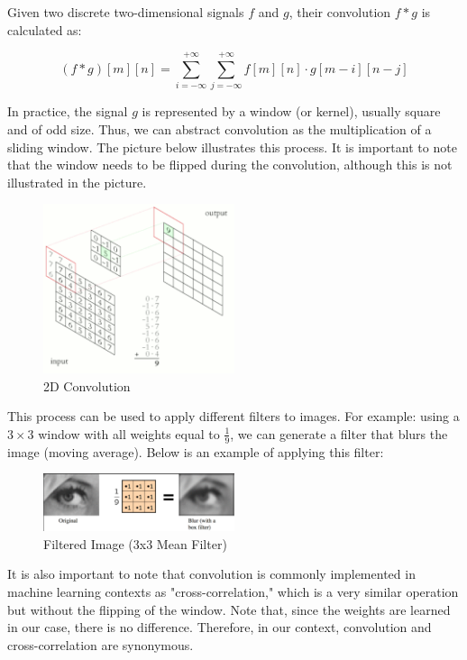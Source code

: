 Given two discrete two-dimensional signals \(f\) and \(g\), their convolution \(f * g\) is calculated as:

\[
(f*g)[m][n] = \sum_{i=-\infty}^{+\infty} \sum_{j=-\infty}^{+\infty} f[m][n] \cdot g[m-i][n-j]
\]

In practice, the signal \(g\) is represented by a window (or kernel), usually square and of odd size. Thus, we can abstract convolution as the multiplication of a sliding window. The picture below illustrates this process. It is important to note that the window needs to be flipped during the convolution, although this is not illustrated in the picture.

\begin{figure}[h!]
    \centering
    \includegraphics[width=0.5\textwidth]{figuras/conv.png}
    \caption{2D Convolution}
\end{figure}

This process can be used to apply different filters to images. For example: using a \(3 \times 3\) window with all weights equal to \(\frac{1}{9}\), we can generate a filter that blurs the image (moving average). Below is an example of applying this filter:

\begin{figure}[h!]
    \centering
    \includegraphics[width=0.5\textwidth]{figuras/blur.png}
    \caption{Filtered Image (3x3 Mean Filter)}
\end{figure}

It is also important to note that convolution is commonly implemented in machine learning contexts as "cross-correlation," which is a very similar operation but without the flipping of the window. Note that, since the weights are learned in our case, there is no difference. Therefore, in our context, convolution and cross-correlation are synonymous.

